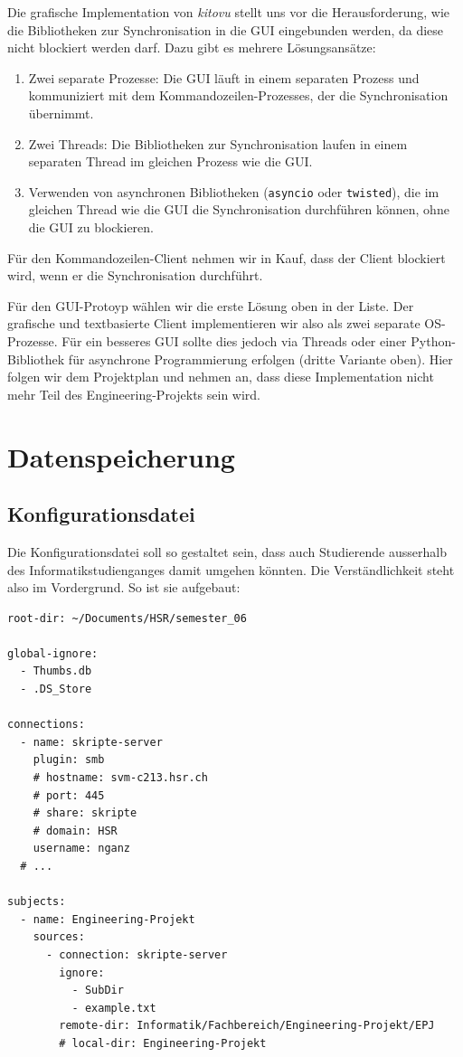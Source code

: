 \documentclass[a4paper]{article}
\let\oldsection\section
\renewcommand\section{\clearpage\oldsection}
\begin{document}
Die grafische Implementation von \emph{kitovu} stellt uns vor die Herausforderung, wie die Bibliotheken zur Synchronisation in die GUI eingebunden werden, da diese nicht blockiert werden darf. Dazu gibt es mehrere Lösungsansätze:

\begin{enumerate}
	\item Zwei separate Prozesse: Die GUI läuft in einem separaten Prozess und kommuniziert mit dem Kommandozeilen-Prozesses, der die Synchronisation übernimmt.
	\item Zwei Threads: Die Bibliotheken zur Synchronisation laufen in einem separaten Thread im gleichen Prozess wie die GUI.
	\item Verwenden von asynchronen Bibliotheken (\verb|asyncio| oder \verb|twisted|), die im gleichen Thread wie die GUI die Synchronisation durchführen können, ohne die GUI zu blockieren.
\end{enumerate}

Für den Kommandozeilen-Client nehmen wir in Kauf, dass der Client blockiert wird, wenn er die Synchronisation durchführt.

Für den GUI-Protoyp wählen wir die erste Lösung oben in der Liste. Der grafische und textbasierte Client implementieren wir also als zwei separate OS-Prozesse. Für ein besseres GUI sollte dies jedoch via Threads oder einer Python-Bibliothek für asynchrone Programmierung erfolgen (dritte Variante oben). Hier folgen wir dem Projektplan und nehmen an, dass diese Implementation nicht mehr Teil des Engineering-Projekts sein wird.

\section{Datenspeicherung}

\subsection{Konfigurationsdatei}
Die Konfigurationsdatei soll so gestaltet sein, dass auch Studierende ausserhalb des Informatikstudienganges damit umgehen könnten. Die Verständlichkeit steht also im Vordergrund. So ist sie aufgebaut:

\begin{verbatim}
root-dir: ~/Documents/HSR/semester_06

global-ignore:
  - Thumbs.db
  - .DS_Store

connections:
  - name: skripte-server
    plugin: smb
    # hostname: svm-c213.hsr.ch
    # port: 445
    # share: skripte
    # domain: HSR
    username: nganz
  # ...

subjects:
  - name: Engineering-Projekt
    sources:
      - connection: skripte-server
        ignore:
          - SubDir
          - example.txt
        remote-dir: Informatik/Fachbereich/Engineering-Projekt/EPJ
        # local-dir: Engineering-Projekt
\end{verbatim}
\end{document}
